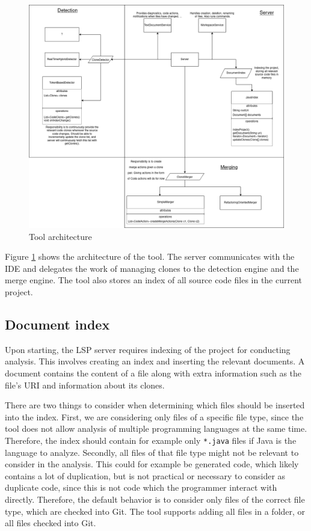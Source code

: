 \begin{figure}
	\includegraphics[width=\textwidth]{images/ToolArchitecture.png}
	\caption{Tool architecture}
	\label{fig:architecture}
\end{figure}

Figure \ref{fig:architecture} shows the architecture of the tool. The server communicates
with the IDE and delegates the work of managing clones to the detection engine and the
merge engine. The tool also stores an index of all source code files in the current project.

\subsection{Document index}

Upon starting, the LSP server requires indexing of the project for conducting analysis.
This involves creating an index and inserting the relevant documents. A document contains the
content of a file along with extra information such as the file's URI and information
about its clones.

There are two things to consider when determining which files should be inserted into the
index. First, we are considering only files of a specific file type, since the tool does
not allow analysis of multiple programming languages at the same time. Therefore, the
index should contain for example only \verb|*.java| files if Java is the language to
analyze. Secondly, all files of that file type might not be relevant to consider in the
analysis. This could for example be generated code, which likely contains a lot of
duplication, but is not practical or necessary to consider as duplicate code, since this
is not code which the programmer interact with directly. Therefore, the default behavior
is to consider only files of the correct file type, which are checked into Git. The tool
supports adding all files in a folder, or all files checked into Git.

